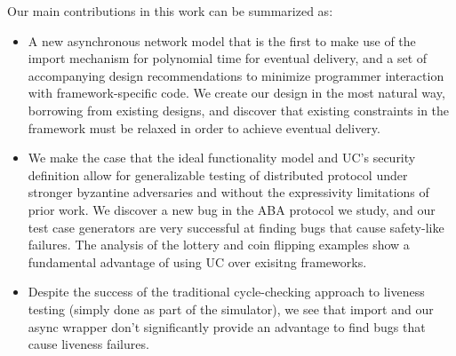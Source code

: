 Our main contributions in this work can be summarized as:
\begin{itemize}
\item A new asynchronous network model that is the first to make use of the import mechanism for polynomial time for eventual delivery, and a set of accompanying design recommendations to minimize programmer interaction with framework-specific code. We create our design in the most natural way, borrowing from existing designs, and discover that existing constraints in the framework must be relaxed in order to achieve eventual delivery.
\item We make the case that the ideal functionality model and UC's security definition allow for generalizable testing of distributed protocol under stronger byzantine adversaries and without the expressivity limitations of prior work. We discover a new bug in the ABA protocol we study, and our test case generators are very successful at finding bugs that cause safety-like failures. The analysis of the lottery and coin flipping examples show a fundamental advantage of using UC over exisitng frameworks.
\item Despite the success of the traditional cycle-checking approach to liveness testing (simply done as part of the simulator), we see that import and our async wrapper don't significantly provide an advantage to find bugs that cause liveness failures. 
\end{itemize}



